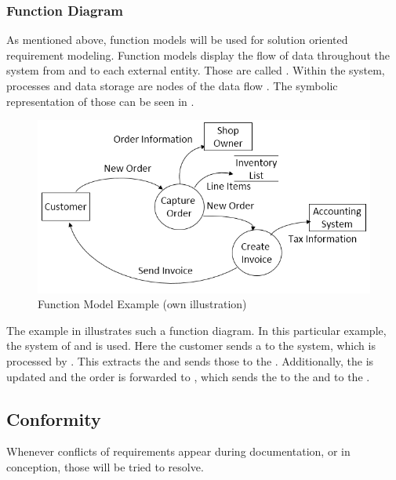 \subsubsection{Function Diagram}

As mentioned above, function models will be used for solution oriented requirement modeling. Function models display the flow of data throughout the system from and to each external entity. Those are called  \parencite[190]{Pohl.2007}. Within the system, processes and data storage are nodes of the data flow \parencite[cf.][190-191]{Pohl.2007}. The symbolic representation of those can be seen in .  

\begin{figure}[H]
    \centering
    \includegraphics{img/fmEx.png}
    \caption[Function Model Example]{Function Model Example (own illustration)}
    \label{fig:fmEx}
\end{figure}

The example in  illustrates such a function diagram. In this particular example, the system of  and  is used. Here the customer sends a  to the system, which is processed by . This extracts the  and sends those to the . Additionally, the  is updated and the order is forwarded to , which sends the  to the  and  to the .

\subsection{Conformity}
Whenever conflicts of requirements appear during documentation, or in conception, those will be tried to resolve. 

